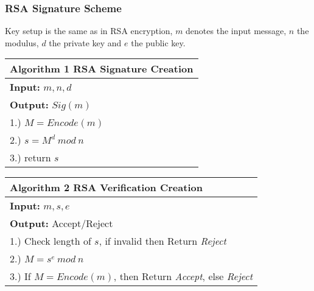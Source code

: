 \documentclass[a4paper, 10 pt, conference]{ieeeconf}
\begin{document}
\vspace{0.5cm}
\subsubsection{\textbf{RSA Signature Scheme}}
Key setup is the same as in RSA encryption, $m$ denotes the input message, $n$ the modulus, $d$ the private key and $e$ the public key.\\
\begin{table}[h!]
  \begin{center}
    \begin{tabular}{ l   }
    \toprule
    \textbf{Algorithm 1} RSA Signature Creation \\ \midrule
    \textbf{Input:} $m,n,d$ \\ 
    \textbf{Output:} $Sig(m)$ \\
 1.) $M = Encode (m)$ \\
 2.) $s = M^{d} \ mod \ n$ \\
 3.) return $s$ \\

    \bottomrule
    \end{tabular}
  \end{center}
\end{table}

\pagebreak
\begin{table}[h!]
  \begin{center}
    \begin{tabular}{ l   }
    \toprule
    \textbf{Algorithm 2} RSA Verification Creation \\ \midrule
    \textbf{Input:} $m,s,e$ \\ 
    \textbf{Output:} Accept/Reject \\
    1.) Check length of $s$, if invalid then Return \emph{Reject} \\
    2.) $M = s^{e} \ mod \ n$ \\
    3.) If $M=Encode(m)$, then Return \emph{Accept}, else \emph{Reject} \\
    \bottomrule
    \end{tabular}
  \end{center}
\end{table}


\vspace{0.5cm}
\end{document}
